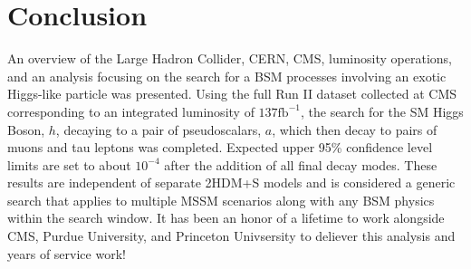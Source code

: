 \clearpage

\section{Conclusion}
\label{sec:conc}
An overview of the Large Hadron Collider, CERN, CMS, luminosity operations, and an analysis focusing on the search for a BSM processes involving an exotic Higgs-like particle was presented.
Using the full Run II dataset collected at CMS corresponding to an integrated luminosity of $\text{137}\text{fb}^{-1}$, the search for the SM Higgs Boson, $h$, decaying to a pair of pseudoscalars, $a$, which then decay to pairs of muons and tau leptons was completed. 
Expected upper 95\% confidence level limits are set to about $10^{-4}$ after the addition of all final decay modes. 
These results are independent of separate 2HDM+S models and is considered a generic search that applies to multiple MSSM scenarios along with any BSM physics within the search window. 
It has been an honor of a lifetime to work alongside CMS, Purdue University, and Princeton Univsersity to deliever this analysis and years of service work! 

